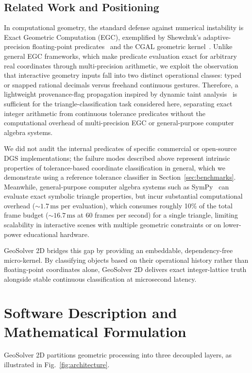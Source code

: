 \documentclass[preprint,12pt]{elsarticle}
\begin{document}
\subsection{Related Work and Positioning}
In computational geometry, the standard defense against numerical instability is Exact Geometric Computation (EGC), exemplified by Shewchuk's adaptive-precision floating-point predicates~\cite{shewchuk1997} and the CGAL geometric kernel~\cite{cgal2024}. Unlike general EGC frameworks, which make predicate evaluation exact for arbitrary real coordinates through multi-precision arithmetic, we exploit the observation that interactive geometry inputs fall into two distinct operational classes: typed or snapped rational decimals versus freehand continuous gestures. Therefore, a lightweight provenance-flag propagation inspired by dynamic taint analysis~\cite{schwartz2010} is sufficient for the triangle-classification task considered here, separating exact integer arithmetic from continuous tolerance predicates without the computational overhead of multi-precision EGC or general-purpose computer algebra systems.

We did not audit the internal predicates of specific commercial or open-source DGS implementations; the failure modes described above represent intrinsic properties of tolerance-based coordinate classification in general, which we demonstrate using a reference tolerance classifier in Section~\ref{sec:benchmarks}. Meanwhile, general-purpose computer algebra systems such as SymPy~\cite{meurer2017} can evaluate exact symbolic triangle properties, but incur substantial computational overhead ($\sim 1.7\,\text{ms}$ per evaluation), which consumes roughly 10\% of the total frame budget ($\sim 16.7\,\text{ms}$ at 60 frames per second) for a single triangle, limiting scalability in interactive scenes with multiple geometric constraints or on lower-power educational hardware.

GeoSolver 2D bridges this gap by providing an embeddable, dependency-free micro-kernel. By classifying objects based on their operational history rather than floating-point coordinates alone, GeoSolver 2D delivers exact integer-lattice truth alongside stable continuous classification at microsecond latency.

\section{Software Description and Mathematical Formulation}

GeoSolver 2D partitions geometric processing into three decoupled layers, as illustrated in Fig.~\ref{fig:architecture}.
\end{document}
